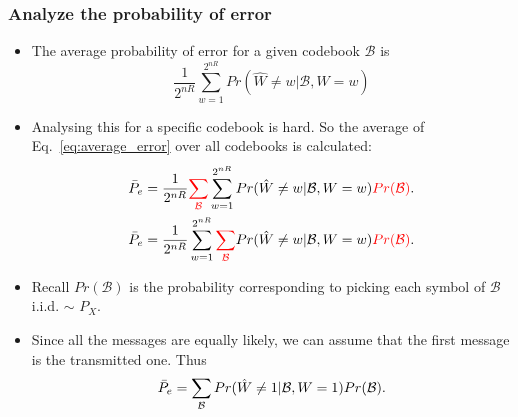 \documentclass[12pt]{article}
\begin{document}
\subsubsection{Analyze the probability of error}
\begin{itemize}
    \item The average probability of error for a given codebook $\mathcal{B}$ is 
    \begin{equation}
        \frac{1}{2^{nR}} \sum_{w=1}^{2^{nR}} Pr(\hat{W}\not = w |\mathcal{B}, W=w)
        \label{eq:average_error}
    \end{equation}
    \item Analysing this for a specific codebook is hard. So the average of Eq.~\ref{eq:average_error} over all codebooks is calculated:
    \begin{align*}
        \Bar{P}_e &= \frac{1}{2^{nR}} \textcolor{red}{\sum_{\mathcal{B}}}\sum_{w=1}^{2^{nR}} Pr(\hat{W}\not = w |\mathcal{B}, W=w)\textcolor{red}{Pr(\mathcal{B})}. \\
        \Bar{P}_e &= \frac{1}{2^{nR}} \sum_{w=1}^{2^{nR}} \textcolor{red}{\sum_{\mathcal{B}}} Pr(\hat{W}\not = w |\mathcal{B}, W=w)\textcolor{red}{Pr(\mathcal{B})}. \\
    \end{align*}
    \item Recall $Pr(\mathcal{B})$ is the probability corresponding to picking each symbol of $\mathcal{B}$ i.i.d. $\sim$ $P_X$.
    \item Since all the messages are equally likely, we can assume that the first message is the transmitted one. Thus
    \[
    \Bar{P}_e =  \sum_{\mathcal{B}}  Pr(\hat{W}\not = 1 |\mathcal{B}, W=1)Pr(\mathcal{B}). 
    \]
\end{itemize}
\end{document}
